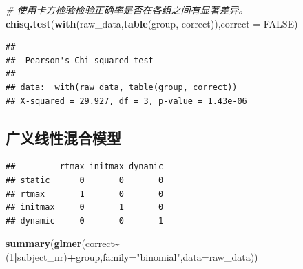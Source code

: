 \documentclass[
]{article}
\newenvironment{Shaded}{\begin{snugshade}}{\end{snugshade}}
\newcommand{\AttributeTok}[1]{\textcolor[rgb]{0.13,0.29,0.53}{#1}}
\newcommand{\CommentTok}[1]{\textcolor[rgb]{0.56,0.35,0.01}{\textit{#1}}}
\newcommand{\ConstantTok}[1]{\textcolor[rgb]{0.56,0.35,0.01}{#1}}
\newcommand{\DecValTok}[1]{\textcolor[rgb]{0.00,0.00,0.81}{#1}}
\newcommand{\FunctionTok}[1]{\textcolor[rgb]{0.13,0.29,0.53}{\textbf{#1}}}
\newcommand{\NormalTok}[1]{#1}
\newcommand{\SpecialCharTok}[1]{\textcolor[rgb]{0.81,0.36,0.00}{\textbf{#1}}}
\newcommand{\StringTok}[1]{\textcolor[rgb]{0.31,0.60,0.02}{#1}}
\begin{document}
\begin{Shaded}
\begin{Highlighting}[]
\CommentTok{\# 使用卡方检验检验正确率是否在各组之间有显著差异。}
\FunctionTok{chisq.test}\NormalTok{(}\FunctionTok{with}\NormalTok{(raw\_data,}\FunctionTok{table}\NormalTok{(group, correct)),}\AttributeTok{correct =} \ConstantTok{FALSE}\NormalTok{)}
\end{Highlighting}
\end{Shaded}

\begin{verbatim}
## 
##  Pearson's Chi-squared test
## 
## data:  with(raw_data, table(group, correct))
## X-squared = 29.927, df = 3, p-value = 1.43e-06
\end{verbatim}

\subsection{广义线性混合模型}\label{ux5e7fux4e49ux7ebfux6027ux6df7ux5408ux6a21ux578b}

\begin{Shaded}
\end{Shaded}

\begin{verbatim}
##         rtmax initmax dynamic
## static      0       0       0
## rtmax       1       0       0
## initmax     0       1       0
## dynamic     0       0       1
\end{verbatim}

\begin{Shaded}
\begin{Highlighting}[]
\FunctionTok{summary}\NormalTok{(}\FunctionTok{glmer}\NormalTok{(correct}\SpecialCharTok{\textasciitilde{}}\NormalTok{(}\DecValTok{1}\SpecialCharTok{|}\NormalTok{subject\_nr)}\SpecialCharTok{+}\NormalTok{group,}\AttributeTok{family=}\StringTok{"binomial"}\NormalTok{,}\AttributeTok{data=}\NormalTok{raw\_data))}
\end{Highlighting}
\end{Shaded}
\end{document}
